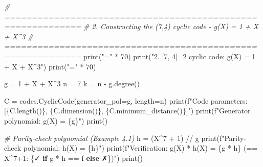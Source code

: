 \documentclass[
]{article}
\newenvironment{Shaded}{}{}
\newcommand{\BuiltInTok}[1]{\textcolor[rgb]{0.00,0.50,0.00}{#1}}
\newcommand{\CommentTok}[1]{\textcolor[rgb]{0.38,0.63,0.69}{\textit{#1}}}
\newcommand{\ControlFlowTok}[1]{\textcolor[rgb]{0.00,0.44,0.13}{\textbf{#1}}}
\newcommand{\DecValTok}[1]{\textcolor[rgb]{0.25,0.63,0.44}{#1}}
\newcommand{\NormalTok}[1]{#1}
\newcommand{\OperatorTok}[1]{\textcolor[rgb]{0.40,0.40,0.40}{#1}}
\newcommand{\SpecialCharTok}[1]{\textcolor[rgb]{0.25,0.44,0.63}{#1}}
\newcommand{\SpecialStringTok}[1]{\textcolor[rgb]{0.73,0.40,0.53}{#1}}
\newcommand{\StringTok}[1]{\textcolor[rgb]{0.25,0.44,0.63}{#1}}
\begin{document}
\begin{Shaded}
\begin{Highlighting}[]
\CommentTok{\# ============================================================}
\CommentTok{\# 2. Constructing the (7,4) cyclic code {-} g(X) = 1 + X + X\^{}3}
\CommentTok{\# ============================================================}
\BuiltInTok{print}\NormalTok{(}\StringTok{"="} \OperatorTok{*} \DecValTok{70}\NormalTok{)}
\BuiltInTok{print}\NormalTok{(}\StringTok{"2. [7, 4]\_2 cyclic code: g(X) = 1 + X + X\^{}3"}\NormalTok{)}
\BuiltInTok{print}\NormalTok{(}\StringTok{"="} \OperatorTok{*} \DecValTok{70}\NormalTok{)}

\NormalTok{g }\OperatorTok{=} \DecValTok{1} \OperatorTok{+}\NormalTok{ X }\OperatorTok{+}\NormalTok{ X}\OperatorTok{\^{}}\DecValTok{3}
\NormalTok{n }\OperatorTok{=} \DecValTok{7}
\NormalTok{k }\OperatorTok{=}\NormalTok{ n }\OperatorTok{{-}}\NormalTok{ g.degree()}

\NormalTok{C }\OperatorTok{=}\NormalTok{ codes.CyclicCode(generator\_pol}\OperatorTok{=}\NormalTok{g, length}\OperatorTok{=}\NormalTok{n)}
\BuiltInTok{print}\NormalTok{(}\SpecialStringTok{f"Code parameters: [}\SpecialCharTok{\{}\NormalTok{C}\SpecialCharTok{.}\NormalTok{length()}\SpecialCharTok{\}}\SpecialStringTok{, }\SpecialCharTok{\{}\NormalTok{C}\SpecialCharTok{.}\NormalTok{dimension()}\SpecialCharTok{\}}\SpecialStringTok{, }\SpecialCharTok{\{}\NormalTok{C}\SpecialCharTok{.}\NormalTok{minimum\_distance()}\SpecialCharTok{\}}\SpecialStringTok{]"}\NormalTok{)}
\BuiltInTok{print}\NormalTok{(}\SpecialStringTok{f"Generator polynomial: g(X) = }\SpecialCharTok{\{}\NormalTok{g}\SpecialCharTok{\}}\SpecialStringTok{"}\NormalTok{)}
\BuiltInTok{print}\NormalTok{()}

\CommentTok{\# Parity{-}check polynomial (Example 4.1)}
\NormalTok{h }\OperatorTok{=}\NormalTok{ (X}\OperatorTok{\^{}}\DecValTok{7} \OperatorTok{+} \DecValTok{1}\NormalTok{) }\OperatorTok{//}\NormalTok{ g}
\BuiltInTok{print}\NormalTok{(}\SpecialStringTok{f"Parity{-}check polynomial: h(X) = }\SpecialCharTok{\{}\NormalTok{h}\SpecialCharTok{\}}\SpecialStringTok{"}\NormalTok{)}
\BuiltInTok{print}\NormalTok{(}\SpecialStringTok{f"Verification: g(X) * h(X) = }\SpecialCharTok{\{}\NormalTok{g }\OperatorTok{*}\NormalTok{ h}\SpecialCharTok{\}}\SpecialStringTok{  (== X\^{}7+1: }\SpecialCharTok{\{}\StringTok{\textquotesingle{}✓\textquotesingle{}} \ControlFlowTok{if}\NormalTok{ g }\OperatorTok{*}\NormalTok{ h }\OperatorTok{==}\NormalTok{ f }\ControlFlowTok{else} \StringTok{\textquotesingle{}✗\textquotesingle{}}\SpecialCharTok{\}}\SpecialStringTok{)"}\NormalTok{)}
\BuiltInTok{print}\NormalTok{()}


\end{Highlighting}
\end{Shaded}
\end{document}
